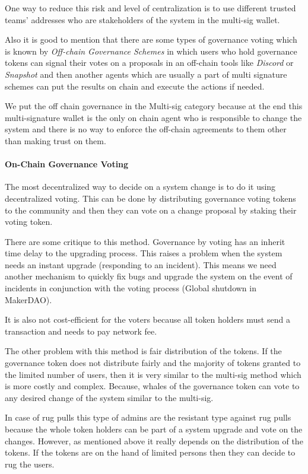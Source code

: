  One way to reduce this risk and level of centralization is to use different trusted teams' addresses who are stakeholders of the system in the multi-sig wallet. 

Also it is good to mention that there are some types of governance voting which is known by \textit{Off-chain Governance Schemes} in which users who hold governance tokens can signal their votes on a proposals in an off-chain tools like \textit{Discord} or \textit{Snapshot} and then another agents which are usually a part of multi signature schemes can put the results on chain and execute the actions if needed.

We put the off chain governance in the Multi-sig category because at the end this multi-signature wallet is the only on chain agent who is responsible to change the system and there is no way to enforce the off-chain agreements to them other than making trust on them.

\paragraph{On-Chain Governance Voting}
The most decentralized way to decide on a system change is to do it using decentralized voting. This can be done by distributing governance voting tokens to the community and then they can vote on a change proposal by staking their voting token. 

There are some critique to this method. Governance by voting has an inherit time delay to the upgrading process. This raises a problem when the system needs an instant upgrade (\eg responding to an incident). This means we need another mechanism to quickly fix bugs and upgrade the system on the event of incidents in conjunction with the voting process (\eg Global shutdown in MakerDAO).

It is also not cost-efficient for the voters because all token holders must send a transaction and needs to pay network fee.

The other problem with this method is fair distribution of the tokens. If the governance token does not distribute fairly and the majority of tokens granted to the limited number of users, then it is very similar to the multi-sig method which is more costly and complex. Because, whales of the governance token can vote to any desired change of the system similar to the multi-sig.
 
In case of rug pulls this type of admins are the resistant type against rug pulls because the whole token holders can be part of a system upgrade and vote on the changes. However, as mentioned above it really depends on the distribution of the tokens. If the tokens are on the hand of limited persons then they can decide to rug the users.

